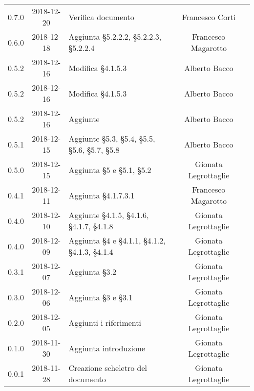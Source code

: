 {\begin{longtable}{ c c C{4cm} c c }
		0.7.0 & 2018-12-20 & Verifica documento & Francesco Corti & \ver{}\\
		
		0.6.0 & 2018-12-18 & Aggiunta §5.2.2.2, §5.2.2.3, §5.2.2.4 & Francesco Magarotto & \reda{} \\
		
		0.5.2 & 2018-12-16 & Modifica §4.1.5.3 & Alberto Bacco & \reda{} \\
		
		0.5.2 & 2018-12-16 & Modifica §4.1.5.3 & Alberto Bacco & \reda{} \\
		
		0.5.2 & 2018-12-16 & Aggiunte  & Alberto Bacco & \reda{} \\
		
		0.5.1 & 2018-12-15 & Aggiunte §5.3, §5.4, §5.5, §5.6, §5.7, §5.8 & Alberto Bacco & \reda{} \\
		
		0.5.0 & 2018-12-15 & Aggiunta §5 e §5.1, §5.2 & Gionata Legrottaglie & \reda{} \\
		
		0.4.1 & 2018-12-11 & Aggiunta §4.1.7.3.1 & Francesco Magarotto & \reda{} \\ 
		
		0.4.0 & 2018-12-10 & Aggiunte §4.1.5, §4.1.6, §4.1.7, §4.1.8 & Gionata Legrottaglie & \reda{} \\ 
		0.4.0 & 2018-12-09 & Aggiunta §4 e §4.1.1, §4.1.2, §4.1.3, §4.1.4 & Gionata Legrottaglie & \reda{} \\ 
		
		0.3.1 & 2018-12-07 & Aggiunta §3.2 & Gionata Legrottaglie & \reda{} \\ 
		
		0.3.0 & 2018-12-06 & Aggiunta §3 e §3.1 & Gionata Legrottaglie & \reda{} \\ 
		
		0.2.0 & 2018-12-05 & Aggiunti i riferimenti & Gionata Legrottaglie & \reda{} \\ 
		
		0.1.0 & 2018-11-30 & Aggiunta introduzione & Gionata Legrottaglie & \reda{} \\
		
		0.0.1 & 2018-11-28 & Creazione scheletro del documento & Gionata Legrottaglie & \reda{}\\
		
	\end{longtable}

}
